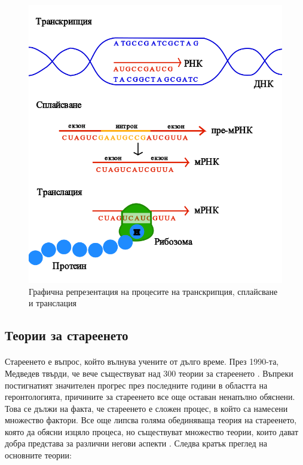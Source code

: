 \documentclass[pdftex,cyrillic,14pt,a4page,twoside,openright]{extreport}
\begin{document}
\begin{figure}[h]
  \centering
  \includegraphics[width=12cm]{figures/transcription_splicing_translation}
  \caption {Графична репрезентация на процесите на транскрипция, сплайсване и транслация}
  \label{fig:transcription_splicing_translation}
\end{figure}

\subsection{Теории за стареенето}
\paragraph{}
Стареенето е въпрос, който вълнува учените от дълго време. През 1990-та, Медведев твърди, че вече съществуват над 300 теории за стареенето \cite{medvedev1990}. Въпреки постигнатият значителен прогрес през последните години в областта на геронтологията, причините за стареенето все още оставан ненапълно обяснени. Това се дължи на факта, че стареенето е сложен процес, в който са намесени множество фактори. Все още липсва голяма обединяваща теория на стареенето, която да обясни изцяло процеса, но съществуват множество теории, които дават добра представа за различни негови аспекти \cite{vina2007}. Следва кратък преглед на основните теории:
\end{document}
